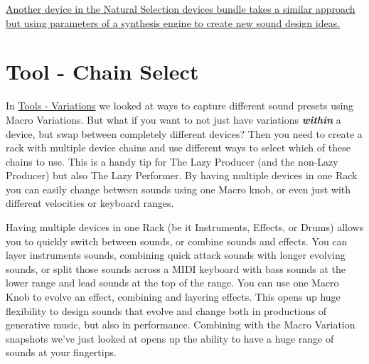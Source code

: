\documentclass[
  12pt,
  letterpaper,
  oneside,
  open=any]{scrbook}
\begin{document}
\href{https://dillonbastan.com/store/maxforlive/index.php?product=natural-selection-s}{Another
device in the Natural Selection devices bundle takes a similar approach
but using parameters of a synthesis engine to create new sound design
ideas.}


\chapter{Tool - Chain Select}\label{Chapter-026-Tool-ChainSelect}

In \hyperref[Chapter-025-Tool-Variations]{Tools - Variations} we looked
at ways to capture different sound presets using Macro Variations. But
what if you want to not just have variations \textbf{\emph{within}} a
device, but swap between completely different devices? Then you need to
create a rack with multiple device chains and use different ways to
select which of these chains to use. This is a handy tip for The Lazy
Producer (and the non-Lazy Producer) but also The Lazy Performer. By
having multiple devices in one Rack you can easily change between sounds
using one Macro knob, or even just with different velocities or keyboard
ranges.

\begin{tcolorbox}[enhanced jigsaw, colback=white, rightrule=.15mm, toprule=.15mm, arc=.35mm, opacitybacktitle=0.6, coltitle=black, leftrule=.75mm, bottomtitle=1mm, toptitle=1mm, left=2mm, bottomrule=.15mm, titlerule=0mm, colbacktitle=quarto-callout-tip-color!10!white, colframe=quarto-callout-tip-color-frame, title=\textcolor{quarto-callout-tip-color}{\faLightbulb}\hspace{0.5em}{Key idea}, breakable, opacityback=0]

Having multiple devices in one Rack (be it Instruments, Effects, or
Drums) allows you to quickly switch between sounds, or combine sounds
and effects. You can layer instruments sounds, combining quick attack
sounds with longer evolving sounds, or split those sounds across a MIDI
keyboard with bass sounds at the lower range and lead sounds at the top
of the range. You can use one Macro Knob to evolve an effect, combining
and layering effects. This opens up huge flexibility to design sounds
that evolve and change both in productions of generative music, but also
in performance. Combining with the Macro Variation snapshots we've just
looked at opens up the ability to have a huge range of sounds at your
fingertips.

\end{tcolorbox}
\end{document}
